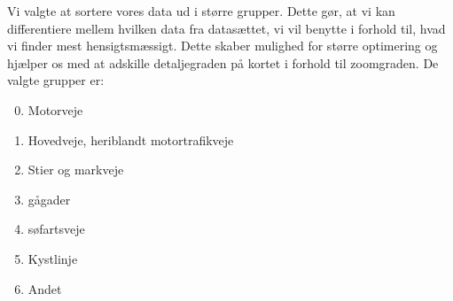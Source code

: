 Vi valgte at sortere vores data ud i større grupper. Dette gør, at vi kan differentiere mellem hvilken data fra datasættet, vi vil benytte i forhold til, hvad vi finder mest hensigtsmæssigt. Dette skaber mulighed for større optimering og hjælper os med at adskille detaljegraden på kortet i forhold til zoomgraden. De valgte grupper er:
\begin{enumerate}
\setcounter{enumi}{-1}
\item{Motorveje}
\item{Hovedveje, heriblandt motortrafikveje}
\item{Stier og markveje}
\item{gågader}
\item{søfartsveje}
\item{Kystlinje}
\item{Andet}
\end{enumerate}